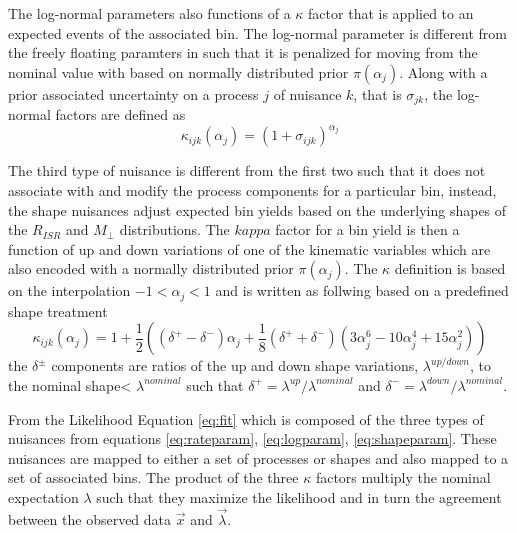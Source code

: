 The log-normal parameters also functions of a $\kappa$ factor that is applied to an expected events of the associated bin. The log-normal parameter is different from the freely floating paramters in such that it is penalized for moving from the nominal value with based on normally distributed prior $\pi(\alpha_j)$. Along with a prior associated uncertainty on a process $j$ of nuisance $k$, that is $\sigma_{jk}$, the log-normal factors are defined as
\begin{equation}
\label{eq:logparam}
\kappa_{ijk}(\alpha_j) = (1+\sigma_{ijk})^{\alpha_j}
\end{equation}

The third type of nuisance is different from the first two such that it does not associate with and modify the process components for a particular bin, instead, the shape nuisances adjust expected bin yields based on the underlying shapes of the $R_{ISR}$ and $M_\perp$ distributions. The $kappa$ factor for a bin yield is then a function of up and down variations of one of the kinematic variables which are also encoded with a normally distributed prior $\pi(\alpha_j)$. The $\kappa$ definition is based on the interpolation $-1<\alpha_j<1$ and is written as follwing based on a predefined shape treatment \cite{combine shapes}
\begin{equation}
\label{eq:shapeparam}
\kappa_{ijk}(\alpha_j)= 1 + \frac{1}{2}((\delta^+ - \delta^-)\alpha_j + \frac{1}{8}(\delta^+ + \delta^-)(3\alpha_j^6-10\alpha_j^4+15\alpha_j^2))
\end{equation}
the $\delta^\pm$ components are ratios of the up and down shape variations, $\lambda^{up/down}$, to the nominal shape< $\lambda^{nominal}$ such that $\delta^+ = \lambda^{up}/\lambda^{nominal}$ and $\delta^- = \lambda^{down}/\lambda^{nominal}.$

From the Likelihood Equation \ref{eq:fit} which is composed of the three types of nuisances from equations \ref{eq:rateparam}, \ref{eq:logparam}, \ref{eq:shapeparam}. These nuisances are mapped to either a set of processes or shapes and also mapped to a set of associated bins. The product of the three $\kappa$ factors multiply the nominal expectation $\lambda$ such that they maximize the likelihood and in turn the agreement between the observed data $\vec{x}$ and $\vec{\lambda}$. 


